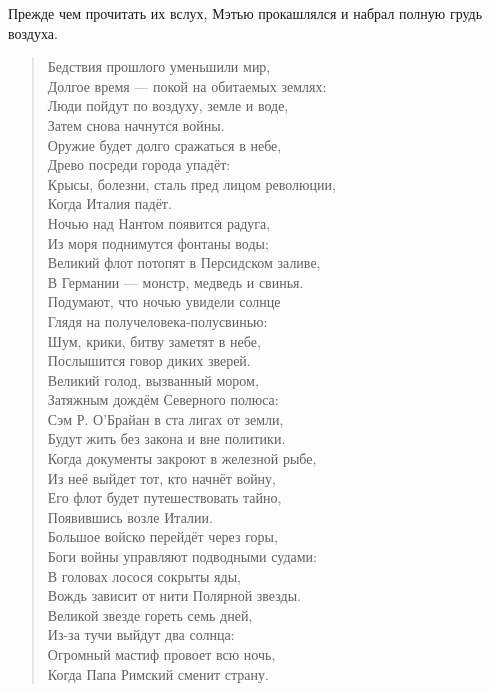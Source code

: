 \documentclass[a5paper, 9pt,
final, openany, twoside=true]{memoir}
\begin{document}
Прежде чем прочитать их вслух, Мэтью прокашлялся и набрал полную грудь воздуха.
\begin{quote}
Бедствия прошлого уменьшили мир,\\
Долгое время — покой на обитаемых землях:\\
Люди пойдут по воздуху, земле и воде,\\
Затем снова начнутся войны.\\

Оружие будет долго сражаться в небе,\\
Древо посреди города упадёт:\\
Крысы, болезни, сталь пред лицом революции,\\
Когда Италия падёт.\\

Ночью над Нантом появится радуга,\\
Из моря поднимутся фонтаны воды;\\
Великий флот потопят в Персидском заливе,\\
В Германии — монстр, медведь и свинья.\\

Подумают, что ночью увидели солнце\\
Глядя на получеловека-полусвинью:\\
Шум, крики, битву заметят в небе,\\
Послышится говор диких зверей.\\

Великий голод, вызванный мором,\\
Затяжным дождём Северного полюса:\\
Сэм Р. О’Брайан в ста лигах от земли,\\
Будут жить без закона и вне политики.\\

Когда документы закроют в железной рыбе,\\
Из неё выйдет тот, кто начнёт войну,\\
Его флот будет путешествовать тайно,\\
Появившись возле Италии.\\

Большое войско перейдёт через горы,\\
Боги войны управляют подводными судами:\\
В головах лосося сокрыты яды,\\
Вождь зависит от нити Полярной звезды.\\

Великой звезде гореть семь дней,\\
Из-за тучи выйдут два солнца:\\
Огромный мастиф провоет всю ночь,\\
Когда Папа Римский сменит страну.\\


\end{quote}
\end{document}
